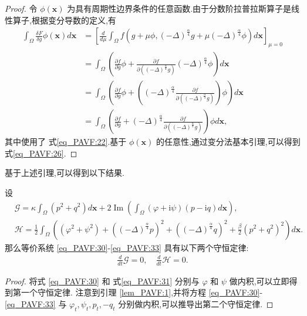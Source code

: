 \begin{proof}
	令 $\phi(\boldsymbol{x})$ 为具有周期性边界条件的任意函数.由于分数阶拉普拉斯算子是线性算子,根据变分导数的定义,有
\begin{equation}
\begin{aligned}
\int_{\Omega} \frac{\delta F}{\delta g} \phi(\boldsymbol{x}) d \boldsymbol{x} &=\left[\frac{d}{d \mu} \int_{\Omega} f\left(g+\mu \phi,(-\Delta)^{\frac{\alpha}{4}} g+\mu(-\Delta)^{\frac{\alpha}{4}} \phi\right) d \boldsymbol{x}\right]_{\mu=0} \\
&=\int_{\Omega}\left(\frac{\partial f}{\partial g} \phi+\frac{\partial f}{\partial\left((-\Delta)^{\frac{\alpha}{4}} g\right)}(-\Delta)^{\frac{\alpha}{4}} \phi\right) d \boldsymbol{x}\\
&=\int_{\Omega}\left(\frac{\partial f}{\partial g} \phi+\left((-\Delta)^{\frac{\alpha}{4}} \frac{\partial f}{\partial\left((-\Delta)^{\frac{\alpha}{4}} g\right)}\right) \phi\right) d \boldsymbol{x} \\
&=\int_{\Omega}\left(\frac{\partial f}{\partial g}+(-\Delta)^{\frac{\alpha}{4}} \frac{\partial f}{\partial\left((-\Delta)^{\frac{\alpha}{4}} g\right)}\right) \phi d \boldsymbol{x},
\end{aligned}
\label{eq_27}\end{equation}
其中使用了 式\eqref{eq_PAVF:22}.基于 $\phi(\boldsymbol{x})$ 的任意性,通过变分法基本引理,可以得到 式\eqref{eq_PAVF:26}.
\end{proof}

基于上述引理,可以得到以下结果.

\begin{theorem}	\label{thm_PAVF:2_1}
设
\begin{align}
&\mathcal{G}=\kappa\int_{\Omega}(p^2+q^2) d \boldsymbol{x}+2\operatorname{Im}(\int_{\Omega}(\varphi+\mathrm{i}\psi)(p-\mathrm{i}q)d \boldsymbol{x}),\label{eq_PAVF:34} \\
&\mathcal{H}=\frac{1}{2}\int_{\Omega}\left((\varphi^2+\psi^2)+\left((-\Delta)^{\frac{\alpha}{4}} p\right)^{2}+\left((-\Delta)^{\frac{\alpha}{4}} q\right)^{2}+\frac{\beta}{2}(p^2+q^2)^{2}\right) d \boldsymbol{x}.\label{eq_PAVF:35}
\end{align}
那么等价系统 \eqref{eq_PAVF:30}-\eqref{eq_PAVF:33} 具有以下两个守恒定律:
\begin{align}
\frac{d}{d t} \mathcal{G}=0, \quad \frac{d}{d t} \mathcal{H}=0.
\end{align}
\end{theorem}

\begin{proof}
将式 \eqref{eq_PAVF:30} 和 式\eqref{eq_PAVF:31} 分别与 $\varphi$ 和 $\psi$ 做内积,可以立即得到第一个守恒定律.
注意到引理 \ref{lem_PAVF:1},并将方程 \eqref{eq_PAVF:30}-\eqref{eq_PAVF:33} 与 $\varphi_{t}, \psi_{t}, p_{t},-q_{t}$ 分别做内积,可以推导出第二个守恒定律.
\end{proof}

